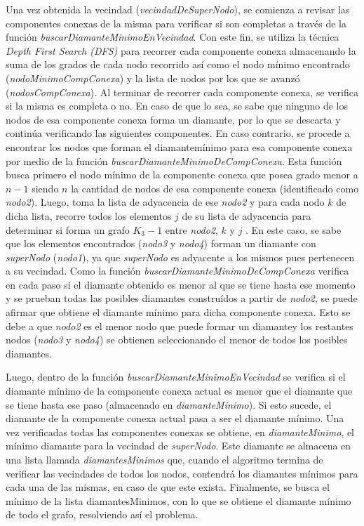 \documentclass[a4paper,11pt] {article}
\begin{document}
Una vez obtenida la vecindad (\textit{vecindadDeSuperNodo}), se comienza a revisar las componentes conexas de la misma para verificar si son completas a trav\'es de la funci\'on \textit{buscarDiamanteMinimoEnVecindad}. Con este fin, se utiliza la técnica \textit{Depth First Search (DFS)} para recorrer cada componente conexa almacenando la suma de los grados de cada nodo recorrido as\'i como el nodo m\'inimo encontrado (\textit{nodoMinimoCompConexa}) y la lista de nodos por los que se avanz\'o (\textit{nodosCompConexa}). Al terminar de recorrer cada componente conexa, se verifica si la misma es completa o no. En caso de que lo sea, se sabe que ninguno de los nodos de esa componente conexa forma un diamante\footnotemark[1], por lo que se descarta y contin\'ua verificando las siguientes componentes. En caso contrario, se procede a encontrar los nodos que forman el diamante\footnotemark[1] m\'inimo para esa componente conexa por medio de la funci\'on \textit{buscarDiamanteMinimoDeCompConexa}. Esta funci\'on busca primero el nodo m\'inimo de la componente conexa que posea grado menor a $n-1$ siendo $n$ la cantidad de nodos de esa componente conexa (identificado como \textit{nodo2}). Luego, toma la lista de adyacencia de ese \textit{nodo2} y para cada nodo $k$ de dicha lista, recorre todos los elementos $j$ de su lista de adyacencia para determinar si forma un grafo $K_{3}-1$ entre \textit{nodo2}, $k$ y $j$ . En este caso, se sabe que los elementos encontrados (\textit{nodo3} y \textit{nodo4}) forman un diamante con \textit{superNodo} (\textit{nodo1}), ya que \textit{superNodo} es adyacente a los mismos pues pertenecen a su vecindad. Como la funci\'on \textit{buscarDiamanteMinimoDeCompConexa} verifica en cada paso si el diamante obtenido es menor al que se tiene hasta ese momento y se prueban todas las posibles diamantes constru\'idos a partir de \textit{nodo2}, se puede afirmar que obtiene el diamante m\'inimo para dicha componente conexa. Esto se debe a que \textit{nodo2} es el menor nodo que puede formar un diamante\footnotemark[1] y los restantes nodos (\textit{nodo3} y \textit{nodo4}) se obtienen seleccionando el menor de todos los posibles diamantes.

Luego, dentro de la funci\'on \textit{buscarDiamanteMinimoEnVecindad} se verifica si el diamante m\'inimo de la componente conexa actual es menor que el diamante que se tiene hasta ese paso (almacenado en \textit{diamanteMinimo}). Si esto sucede, el diamante de la componente conexa actual pasa a ser el diamante m\'inimo. Una vez verificadas todas las componentes conexas se obtiene, en \textit{diamanteMinimo}, el m\'inimo diamante para la vecindad de \textit{superNodo}. Este diamante se almacena en una lista llamada \textit{diamantesMinimos} que, cuando el algoritmo termina de verificar las vecindades de todos los nodos, contendr\'a los diamantes m\'inimos para cada una de las mismas, en caso de que este exista. Finalmente, se busca el m\'inimo de la lista diamantesMinimos, con lo que se obtiene el diamante m\'inimo de todo el grafo, resolviendo as\'i el problema.
\end{document}
